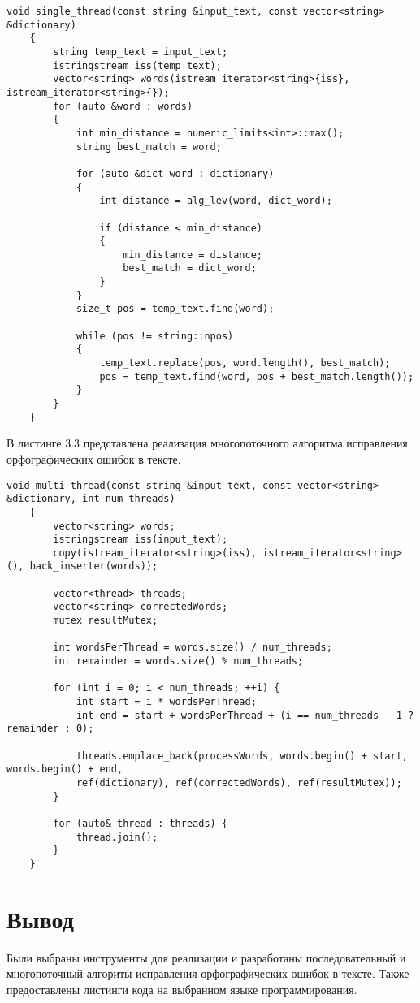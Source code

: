 \begin{lstlisting}[caption=Последовательный алгоритм исправления орфографических ошибок в тексте]
	void single_thread(const string &input_text, const vector<string> &dictionary)
	{
		string temp_text = input_text;
		istringstream iss(temp_text); 
		vector<string> words(istream_iterator<string>{iss}, istream_iterator<string>{}); 
		for (auto &word : words) 
		{
			int min_distance = numeric_limits<int>::max(); 
			string best_match = word; 
			
			for (auto &dict_word : dictionary) 
			{
				int distance = alg_lev(word, dict_word); 
				
				if (distance < min_distance) 
				{
					min_distance = distance; 
					best_match = dict_word; 
				}
			}
			size_t pos = temp_text.find(word);
			
			while (pos != string::npos) 
			{
				temp_text.replace(pos, word.length(), best_match); 
				pos = temp_text.find(word, pos + best_match.length()); 
			}
		}
	}
\end{lstlisting}

\clearpage

В листинге 3.3 представлена реализация многопоточного алгоритма исправления орфографических ошибок в тексте.

\begin{lstlisting}[caption=Многопоточный алгоритм исправления орфографических ошибок в тексте]
	void multi_thread(const string &input_text, const vector<string> &dictionary, int num_threads) 
	{
		vector<string> words;
		istringstream iss(input_text);
		copy(istream_iterator<string>(iss), istream_iterator<string>(), back_inserter(words));
		
		vector<thread> threads;
		vector<string> correctedWords;
		mutex resultMutex;
		
		int wordsPerThread = words.size() / num_threads;
		int remainder = words.size() % num_threads;
		
		for (int i = 0; i < num_threads; ++i) {
			int start = i * wordsPerThread;
			int end = start + wordsPerThread + (i == num_threads - 1 ? remainder : 0);
			
			threads.emplace_back(processWords, words.begin() + start, words.begin() + end,
			ref(dictionary), ref(correctedWords), ref(resultMutex));
		}
		
		for (auto& thread : threads) {
			thread.join();
		}
	}
\end{lstlisting}

\section*{Вывод}

Были выбраны инструменты для реализации и разработаны последовательный и многопоточный алгориты исправления орфографических ошибок в тексте.
Также предоставлены листинги кода на выбранном языке программирования.